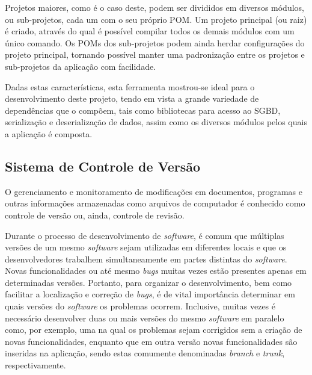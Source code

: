 Projetos maiores, como é o caso deste, podem ser divididos em diversos módulos, ou sub-projetos, cada um com o seu próprio POM.
Um projeto principal (ou raiz) é criado, através do qual é possível compilar todos os demais módulos com um único comando.
Os POMs dos sub-projetos podem ainda herdar configurações do projeto principal, tornando possível manter uma padronização entre os projetos e sub-projetos da aplicação com facilidade.

Dadas estas características, esta ferramenta mostrou-se ideal para o desenvolvimento deste projeto, tendo em vista a grande variedade de dependências que o compõem, tais como bibliotecas para acesso ao SGBD, serialização e deserialização de dados, assim como os diversos módulos pelos quais a aplicação é composta.


\subsection{Sistema de Controle de Versão}\label{met:git}


O gerenciamento e monitoramento de modificações em documentos, programas e outras informações armazenadas como arquivos de computador é conhecido como controle de versão ou, ainda, controle de revisão.

Durante o processo de desenvolvimento de \emph{software}, é comum que múltiplas versões de um mesmo \emph{software} sejam utilizadas em diferentes locais e que os desenvolvedores trabalhem simultaneamente em partes distintas do \emph{software}.
Novas funcionalidades ou até mesmo \emph{bugs} muitas vezes estão presentes apenas em determinadas versões.
Portanto, para organizar o desenvolvimento, bem como facilitar a localização e correção de \emph{bugs}, é de vital importância determinar em quais versões do \emph{software} os problemas ocorrem.
Inclusive, muitas vezes é necessário desenvolver duas ou mais versões do mesmo \emph{software} em paralelo como, por exemplo, uma na qual os problemas sejam corrigidos sem a criação de novas funcionalidades, enquanto que em outra versão novas funcionalidades são inseridas na aplicação, sendo estas comumente denominadas \emph{branch} e \emph{trunk}, respectivamente.

